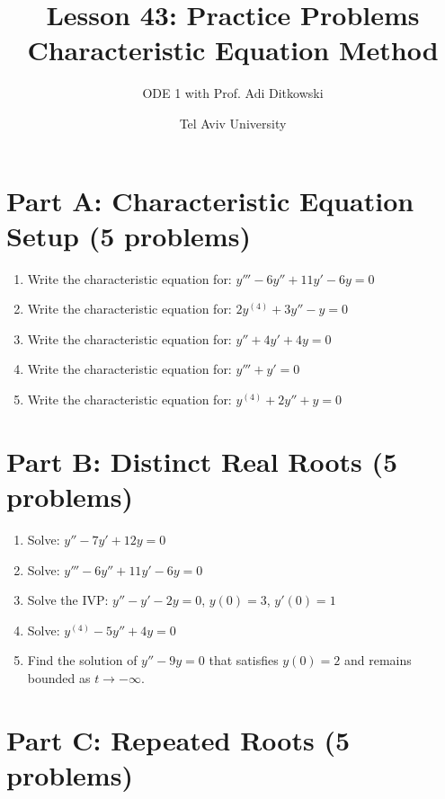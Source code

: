 \documentclass[12pt]{article}
\title{Lesson 43: Practice Problems\\Characteristic Equation Method}
\author{ODE 1 with Prof. Adi Ditkowski}
\date{Tel Aviv University}
\begin{document}
\maketitle

\section*{Part A: Characteristic Equation Setup (5 problems)}

\begin{enumerate}
\item Write the characteristic equation for: $y''' - 6y'' + 11y' - 6y = 0$

\item Write the characteristic equation for: $2y^{(4)} + 3y'' - y = 0$

\item Write the characteristic equation for: $y'' + 4y' + 4y = 0$

\item Write the characteristic equation for: $y''' + y' = 0$

\item Write the characteristic equation for: $y^{(4)} + 2y'' + y = 0$
\end{enumerate}

\section*{Part B: Distinct Real Roots (5 problems)}

\begin{enumerate}[resume]
\item Solve: $y'' - 7y' + 12y = 0$

\item Solve: $y''' - 6y'' + 11y' - 6y = 0$

\item Solve the IVP: $y'' - y' - 2y = 0$, $y(0) = 3$, $y'(0) = 1$

\item Solve: $y^{(4)} - 5y'' + 4y = 0$

\item Find the solution of $y'' - 9y = 0$ that satisfies $y(0) = 2$ and remains bounded as $t \to -\infty$.
\end{enumerate}

\section*{Part C: Repeated Roots (5 problems)}
\end{document}
